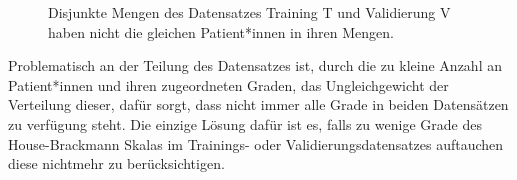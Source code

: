 \begin{figure}[!b]\centering
{}
\caption[Disjunkte Mengen des Datensatzes]{Disjunkte Mengen des Datensatzes Training T und Validierung V haben nicht die gleichen Patient*innen in ihren Mengen.}\label{cap:disjunct}
\end{figure}\label{fig:disjunct}

Problematisch an der Teilung des Datensatzes ist, durch die zu kleine Anzahl an Patient*innen und ihren zugeordneten Graden, das Ungleichgewicht der Verteilung dieser, dafür sorgt, dass nicht immer alle Grade in beiden Datensätzen zu verfügung steht. Die einzige Lösung dafür ist es, falls zu wenige Grade des House-Brackmann Skalas im Trainings- oder Validierungsdatensatzes auftauchen diese nichtmehr zu berücksichtigen.



